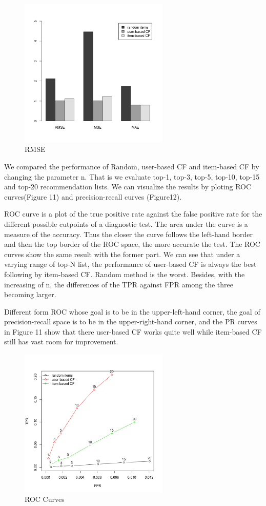 \documentclass[conference]{IEEEtran}
\begin{document}
\begin{figure}
	\centering
	\includegraphics[width=2.8in]{RMSE.png}
	\caption{RMSE}
	\label{fig:side:a}
\end{figure}

We compared the performance of Random, user-based CF and item-based CF by changing the parameter n. That is we evaluate top-1, top-3, top-5, top-10, top-15 and top-20 recommendation lists. We can visualize the results by ploting ROC curves(Figure 11) and precision-recall curves (Figure12). 

ROC curve is a plot of the true positive rate against the false positive rate for the different possible cutpoints of a diagnostic test. The area under the curve is a measure of the accuracy. Thus the closer the curve follows the left-hand border and then the top border of the ROC space, the more accurate the test. The ROC curves show the same result with the former part. We can see that under a varying range of top-N list, the performance of user-based CF is always the best following by item-based CF. Random method is the worst. Besides, with the increasing of n, the differences of the TPR against FPR among the three becoming larger.

Different form ROC whose goal is to be in the upper-left-hand corner, the goal of precision-recall space is to be in the upper-right-hand corner, and the PR curves in Figure 11 show that there user-based CF works quite well while item-based CF still has vast room for improvement.

\begin{figure}
	\centering
	\includegraphics[width=2.8in]{ROC.png}
	\caption{ROC Curves}
	\label{fig:side:a}
\end{figure}
\end{document}
